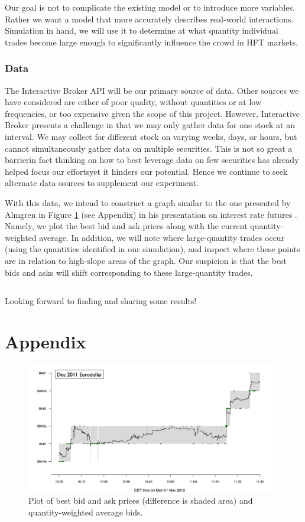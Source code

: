 \documentclass{article}
\begin{document}
Our goal is not to complicate the existing model or to introduce more variables.
Rather we want a model that more accurately describes real-world interactions. 
Simulation in hand, we will use it to determine at what quantity individual trades become large enough to significantly influence the crowd in HFT markets.

\subsubsection*{Data}
The Interactive Broker API will be our primary source of data. 
Other sources we have considered are either of poor quality, without quantities or at low frequencies, or too expensive given the scope of this project.
However, Interactive Broker presents a challenge in that we may only gather data for one stock at an interval. 
We may collect for different stock on varying weeks, days, or hours, but cannot simultaneously gather data on multiple securities.
This is not so great a barrier\textemdash in fact thinking on how to best leverage data on few securities has already helped focus our efforts\textemdash yet it hinders our potential.
Hence we continue to seek alternate data sources to supplement our experiment.

With this data, we intend to construct a graph similar to the one presented by Almgren in Figure \ref{fig:almgren} (see Appendix) in his presentation on interest rate futures \cite{almgren}.
Namely, we plot the best bid and ask prices along with the current quantity-weighted average.
In addition, we will note where large-quantity trades occur (using the quantities identified in our simulation), and inspect where these points are in relation to high-slope areas of the graph.
Our suspicion is that the best bids and asks will shift corresponding to these large-quantity trades.

\subsection*{}

Looking forward to finding and sharing some results!




\newpage

\section*{Appendix}

\begin{figure}[h]
\includegraphics[width=\textwidth]{almgren.png}
\caption{Plot of best bid and ask prices (difference is shaded area) and quantity-weighted average bids.}
\label{fig:almgren}
\end{figure}
\end{document}
